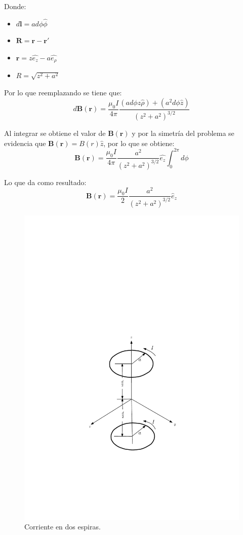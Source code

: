 Donde:
\begin{itemize}
  \item $d\mathbf{l}=a d\phi \hat{\phi}$
  \item $\mathbf{R}=\mathbf{r}-\mathbf{r'}$
  \item $\mathbf{r}=z\hat{e_{z}}-a\hat{e_{\rho}}$
  \item $R=\sqrt{z^{2}+a^{2}}$
\end{itemize}

Por lo que reemplazando se tiene que:
\begin{equation}
  d\mathbf{B}(\mathbf{r}) = \frac{\mu_{0}I}{4\pi} \frac{(a d\phi z \hat{\rho}) + (a^{2}d\phi \hat{z})}{(z^{2}+a^{2})^{3/2}}
\end{equation}

Al integrar se obtiene el valor de $\mathbf{B}(\mathbf{r})$ y por la simetría
del problema se evidencia que $\mathbf{B}(\mathbf{r}) = B(r)\hat{z}$,
por lo que se obtiene:
\begin{equation}
  \mathbf{B}(\mathbf{r}) = \frac{\mu_{0}I}{4 \pi} \frac{a^{2}}{(z^{2}+a^{2})^{3/2}} \hat{e_{z}} \int _{0}^{2 \pi} d\phi
\end{equation}

Lo que da como resultado:
\begin{equation}
  \mathbf{B}(\mathbf{r}) = \frac{\mu_{0}I}{2} \frac{a^{2}}{(z^{2}+a^{2})^{3/2}} \hat{e}_{z}
  \label{eq:Campo_magnetico_espira}
\end{equation}

\begin{figure}[htbp!]
  \centering
  \includegraphics[width=0.6\linewidth]{./images/two-loops.pdf}
  \caption{Corriente en dos espiras.}
  \label{fig:two-loops}
\end{figure}

